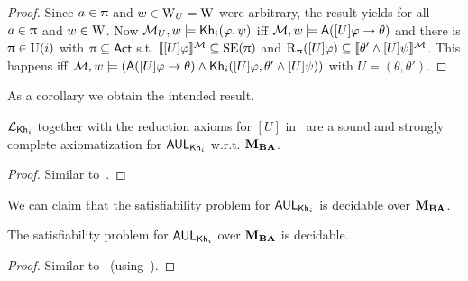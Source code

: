 \begin{proof}
	Since $a \in \uppi$ and $w \in \operatorname{W}_{{U}} = \operatorname{W}$ were arbitrary, the result yields for all $a \in \uppi$ and $w \in \operatorname{W}$.
	Now $\mathcal{M}_{{U}},w \models {\sf Kh}_i(\varphi,\psi)$ iff $\mathcal{M},w \models {\sf A}([U]\varphi \rightarrow \theta)$ and there is $\uppi \in \operatorname{U}(i)$ with $\uppi \subseteq {\rm \sf Act}$ s.t. $\llbracket [U]\varphi \rrbracket^{\mathcal{M}} \subseteq \operatorname{SE}(\uppi)$ and $\operatorname{R}_\uppi([U]\varphi) \subseteq \llbracket \theta' \wedge [U]\psi \rrbracket^{\mathcal{M}}$.
	This happens iff $\mathcal{M},w \models ({\sf A}([U]\varphi \rightarrow \theta) \wedge {\sf Kh}_i([U]\varphi,\theta' \wedge [U]\psi))$ with $U = (\theta,\theta')$.
\end{proof}

As a corollary we obtain the intended result.

\medskip 

\begin{theorem}\label{th:aulcomplete}
$\mathcal{L}_{{\sf Kh}_i}$ together with the reduction axioms for $[U]$ in~ are a sound and strongly complete axiomatization for $\mathsf{AUL}_{{\sf Kh}_i}$ w.r.t. $\mathbf{M}_{\mathbf{BA}}$.
\end{theorem}

\begin{proof}
Similar to~.
\end{proof}

We can claim that the satisfiability problem for $\mathsf{AUL}_{{\sf Kh}_i}$ is decidable over $\mathbf{M}_{\mathbf{BA}}$.

\medskip 

\begin{corollary}\label{cor:aulsat}
The satisfiability problem for $\mathsf{AUL}_{{\sf Kh}_i}$ over $\mathbf{M}_{\mathbf{BA}}$ is decidable.
\end{corollary}
\begin{proof}
Similar to~ (using~).
\end{proof}
